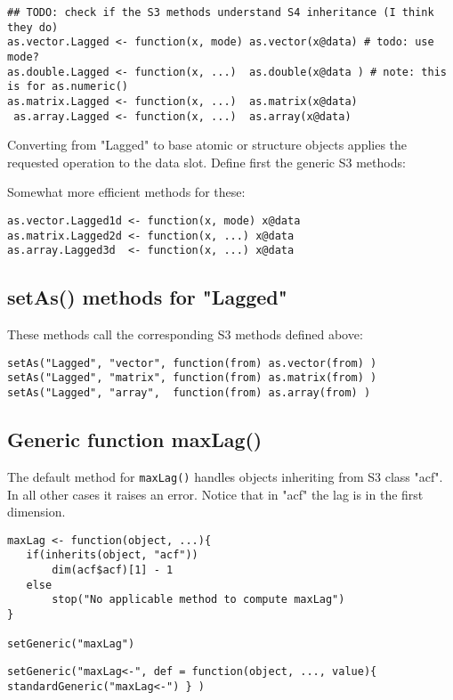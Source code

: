 \documentclass[11pt,a4paper]{article}
\begin{document}
\begin{verbatim}
## TODO: check if the S3 methods understand S4 inheritance (I think they do)
as.vector.Lagged <- function(x, mode) as.vector(x@data) # todo: use mode?
as.double.Lagged <- function(x, ...)  as.double(x@data ) # note: this is for as.numeric()
as.matrix.Lagged <- function(x, ...)  as.matrix(x@data)
 as.array.Lagged <- function(x, ...)  as.array(x@data)
\end{verbatim}
Converting from "Lagged" to base atomic or structure objects applies the requested
operation to the data slot. Define first the generic S3 methods:

Somewhat more efficient methods for these:
\begin{verbatim}
as.vector.Lagged1d <- function(x, mode) x@data
as.matrix.Lagged2d <- function(x, ...) x@data
as.array.Lagged3d  <- function(x, ...) x@data
\end{verbatim}


\subsection{setAs() methods for "Lagged"}
\label{sec:org997b2c6}

These methods call the corresponding S3 methods defined above:
\begin{verbatim}
setAs("Lagged", "vector", function(from) as.vector(from) )
setAs("Lagged", "matrix", function(from) as.matrix(from) )
setAs("Lagged", "array",  function(from) as.array(from) )
\end{verbatim}



\subsection{Generic function maxLag()}
\label{sec:orgc699efe}

The default method for \texttt{maxLag()} handles objects inheriting from S3 class "acf". In all
other cases it raises an error. Notice that in "acf" the lag is in the first dimension.
\begin{verbatim}
maxLag <- function(object, ...){
   if(inherits(object, "acf"))
       dim(acf$acf)[1] - 1
   else
       stop("No applicable method to compute maxLag")
}

setGeneric("maxLag")
\end{verbatim}

\begin{verbatim}
setGeneric("maxLag<-", def = function(object, ..., value){ standardGeneric("maxLag<-") } )
\end{verbatim}
\end{document}
